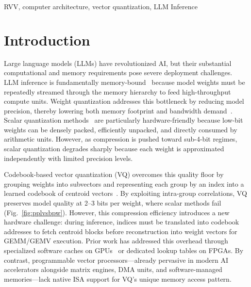 \documentclass[conference]{IEEEtran}
\begin{document}
\begin{IEEEkeywords}
RVV, computer architecture, vector quantization, LLM Inference
\end{IEEEkeywords}


\section{Introduction}

Large language models (LLMs) have revolutionized AI, but their substantial computational and memory requirements pose severe deployment challenges. LLM inference is fundamentally memory-bound~\cite{ivanovDataMovementAll2021} because model weights must be repeatedly streamed through the memory hierarchy to feed high-throughput compute units. Weight quantization addresses this bottleneck by reducing model precision, thereby lowering both memory footprint and bandwidth demand~\cite{gongSurveyLowbitLarge2025}. Scalar quantization methods~\cite{zhaoBenchmarkingPostTrainingQuantization,linAWQActivationawareWeight2025} are particularly hardware-friendly because low-bit weights can be densely packed, efficiently unpacked, and directly consumed by arithmetic units. However, as compression is pushed toward sub-4-bit regimes, scalar quantization degrades sharply because each weight is approximated independently with limited precision levels.

Codebook-based vector quantization (VQ) overcomes this quality floor by grouping weights into subvectors and representing each group by an index into a learned codebook of centroid vectors~\cite{egiazarianExtremeCompressionLarge2024,liuVPTQExtremeLowbit2024,tsengQuIPEvenBetter2024,xuRSAVQRiemannianSensitivityAware2025,xuCRVQChannelRelaxedVectora}. 
By exploiting intra-group correlations, VQ preserves model quality at 2--3 bits per weight, where scalar methods fail (Fig.~\ref{fig:pplvsbpw}). 
However, this compression efficiency introduces a new hardware challenge: during inference, indices must be translated into codebook addresses to fetch centroid blocks before reconstruction into weight vectors for GEMM/GEMV execution.
Prior work has addressed this overhead through specialized software caches on GPUs~\cite{liuVQLLMHighperformanceCode2025} or dedicated lookup tables on FPGAs. 
By contrast, programmable vector processors---already pervasive in modern AI accelerators alongside matrix engines, DMA units, and software-managed memories---lack native ISA support for VQ's unique memory access pattern. 
\end{document}

